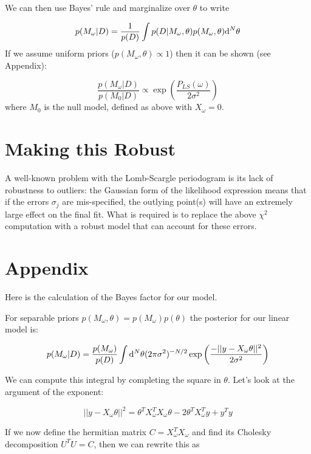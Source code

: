 \documentclass[12pt,pdftex]{article}
\begin{document}
We can then use Bayes' rule and marginalize over $\theta$ to write

\begin{equation}
  p(M_\omega|D) = \frac{1}{p(D)}\int p(D|M_\omega,\theta)p(M_\omega, \theta){\rm d}^N\theta
\end{equation}
If we assume uniform priors ($p(M_\omega, \theta) \propto 1$) then it can be shown (see Appendix):

\begin{equation}
  \frac{p(M_\omega|D)}{p(M_0|D)} \propto \exp\left(\frac{P_{LS}(\omega)}{2\sigma^2}\right)
\end{equation}
where $M_0$ is the null model, defined as above with $X_\omega = 0$.

\section{Making this Robust}
A well-known problem with the Lomb-Scargle periodogram is its lack of robustness to outliers: the Gaussian form of the likelihood expression means that if the errors $\sigma_j$ are mis-specified, the outlying point(s) will have an extremely large effect on the final fit. What is required is to replace the above $\chi^2$ computation with a robust model that can account for these errors.

\section{Appendix}
Here is the calculation of the Bayes factor for our model.

For separable priors $p(M_\omega,\theta) = p(M_\omega)p(\theta)$ the posterior for our linear model is:

\begin{equation}
  p(M_\omega|D) = \frac{p(M_\omega)}{p(D)}\int{\rm d}^N\theta(2\pi\sigma^2)^{-N/2}\exp\left(\frac{-||y - X_\omega\theta||^2}{2\sigma^2}\right)
\end{equation}

We can compute this integral by completing the square in $\theta$. Let's look at the argument of the exponent:

\begin{equation}
  ||y - X_\omega\theta||^2 = \theta^TX_\omega^TX_\omega\theta - 2\theta^TX_\omega^Ty + y^Ty
\end{equation}

If we now define the hermitian matrix $C = X_\omega^TX_\omega$ and find its Cholesky decomposition $U^TU = C$, then we can rewrite this as
\end{document}
